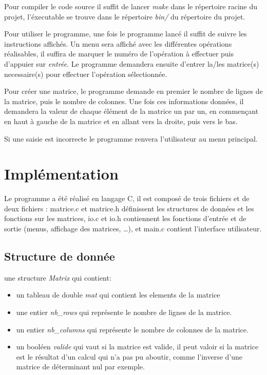 \documentclass[a4paper,11pt,DIV=11]{scrartcl}
\begin{document}
\begin{onehalfspace}
    Pour compiler le code source il suffit de lancer \emph{make} dans le répertoire racine du projet,
    l'éxecutable se trouve dans le répertoire \emph{bin/} du répertoire du projet.
    
    Pour utiliser le programme, une fois le programme lancé il suffit de suivre les instructions affichés.
    Un menu sera affiché avec les différentes opérations réalisables, il suffira de marquer le numéro de 
    l'opération à effectuer puis d'appuier sur \emph{entrée}. Le programme demandera ensuite d'entrer
    la/les matrice(s) necessaire(s) pour effectuer l'opération sélectionnée.

    Pour créer une matrice, le programme demande en premier le nombre de lignes de la matrice, puis le
    nombre de colonnes. Une fois ces informations données, il demandera la valeur de chaque élément de la
    matrice un par un, en commençant en haut à gauche de la matrice et en allant vers la droite, puis
    vers le bas.

    Si une saisie est incorrecte le programme renvera l'utilisateur au menu principal.


    \section*{Implémentation}


    Le programme a été réalisé en langage C, il est composé de trois fichiers  et de deux fichiers
    : matrice.c et matrice.h définissent les structures de données et les fonctions sur les matrices,
    io.c et io.h contiennent les fonctions d'entrée et de sortie (menus, affichage des matrices, \ldots), et
    main.c contient l'interface utilisateur.\\ 

    \subsection*{Structure de donnée}

    une structure \emph{Matrix} qui contient:
    \begin{itemize}
        \item un tableau de double \emph{mat} qui contient les elements de la matrice
        \item une entier \emph{nb\_rows} qui représente le nombre de lignes de la matrice.
        \item un entier \emph{nb\_columns} qui représente le nombre de colonnes de la matrice.
        \item un booléen \emph{valide} qui vaut  si la matrice est valide, il peut valoir
             si la matrice est le résultat d'un calcul qui n'a pas pu aboutir, comme
            l'inverse d'une matrice de déterminant nul par exemple.
    \end{itemize}




\end{onehalfspace}
\end{document}
